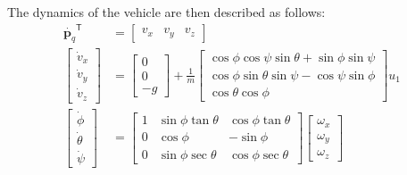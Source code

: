 \documentclass[letterpaper, 10 pt, conference]{ieeeconf}  %
\begin{document}
The dynamics of the vehicle are then described as follows:
\begin{equation}
	\begin{aligned}
	\dot{\bm{p}_q}^{\mathsf{T}} &= \begin{bmatrix}v_x & v_y & v_z\end{bmatrix}\\
	\begin{bmatrix}\dot{v}_x \\ \dot{v}_y \\ \dot{v}_z\end{bmatrix} &= \begin{bmatrix}0 \\ 0 \\ -g \end{bmatrix} + \frac{1}{m} \begin{bmatrix}\cos\phi \cos\psi \sin\theta + \sin\phi \sin\psi \\ \cos\phi \sin\theta \sin\psi - \cos\psi \sin\phi \\ \cos\theta \cos\phi \end{bmatrix} u_1\\
	\begin{bmatrix}\dot{\phi} \\ \dot{\theta} \\ \dot{\psi}\end{bmatrix} &= \begin{bmatrix}1 & \sin\phi \tan\theta & \cos\phi \tan\theta\\ 0 & \cos\phi & -\sin\phi \\ 0 & \sin\phi \sec\theta & \cos\phi \sec\theta \end{bmatrix} \begin{bmatrix}\omega_{x} \\ \omega_{y} \\ \omega_{z} \end{bmatrix}\\

\end{aligned}
\end{equation}
\end{document}
